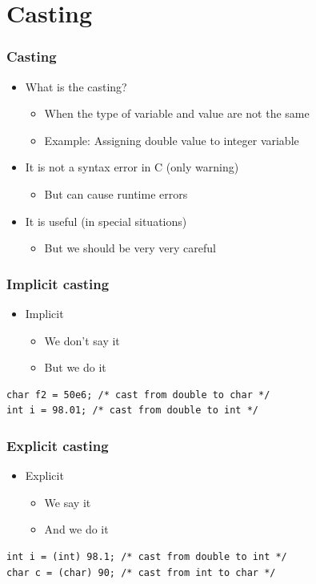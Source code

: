 \documentclass{../c-lecture}
\begin{document}
\section{Casting}

\begin{frame}
  \frametitle{Casting}
  \begin{itemize}
    \item What is the casting?
    \begin{itemize}
      \item
        When the type of variable and value
        {\color{Cyan} are not the same}
      \item Example: Assigning double value to integer variable
    \end{itemize}
    \item It is not a syntax error in C (only warning)
    \begin{itemize}
      \item But can cause {\color{Orange} runtime errors}
    \end{itemize}
    \item It is useful (in special situations)
    \begin{itemize}
      \item But we should be very very careful
    \end{itemize}
  \end{itemize}
\end{frame}

\begin{frame}[fragile]
  \frametitle{Implicit casting}
  \begin{itemize}
    \item Implicit
    \begin{itemize}
      \item We don’t say it
      \item But we do it
    \end{itemize}
  \end{itemize}
  \begin{verbatim}
char f2 = 50e6; /* cast from double to char */
int i = 98.01; /* cast from double to int */
  \end{verbatim}
\end{frame}

\begin{frame}[fragile]
  \frametitle{Explicit casting}
  \begin{itemize}
    \item Explicit
    \begin{itemize}
      \item We say it
      \item And we do it
    \end{itemize}
  \end{itemize}
  \begin{verbatim}
int i = (int) 98.1; /* cast from double to int */
char c = (char) 90; /* cast from int to char */
  \end{verbatim}
\end{frame}
\end{document}
